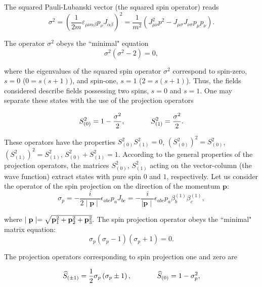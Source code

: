 \documentclass[a4paper,12pt]{article}
\begin{document}
The squared Pauli-Lubanski vector (the squared spin operator)
reads
\begin{equation}
\sigma ^2=\left( \frac 1{2m}\varepsilon _{\mu \nu \alpha \beta
}p_\nu J_{\alpha \beta }\right) ^2=\frac 1{m^2}\left( J_{\mu \nu
}^2p^2-J_{\mu \sigma }J_{\nu \sigma }p_\mu p_\nu \right) .
\label{46}
\end{equation}

The operator $\sigma ^2$ obeys the ``minimal" equation
\begin{equation}
\sigma ^2\left( \sigma ^2-2\right) =0,  \label{47}
\end{equation}

where the eigenvalues of the squared spin operator $\sigma ^2$
correspond to spin-zero, $s=0$ ($0=s(s+1)$),  and spin-one, $s=1$
($2=s(s+1)$). Thus, the fields considered describe fields
possessing two spins, $s=0$ and $s=1$. One may separate these
states with the use of the projection operators

\begin{equation}
S_{(0)}^2=1-\frac{\sigma ^2}2,\hspace{0.5in}S_{(1)}^2=\frac{\sigma
^2}2. \label{48}
\end{equation}

These operators have the properties $S_{(0)}^2S_{(1)}^2=0$,
$\left( S_{(0)}^2\right) ^2=S_{(0)}^2$, $\left( S_{(1)}^2\right)
^2=S_{(1)}^2$, $S_{(0)}^2+S_{(1)}^2=1$. According to the general
properties of the projection operators, the matrices $S_{(0)}^2$,
$S_{(1)}^2$ acting on the vector-column (the wave function)
extract states with pure spin $0$ and $1$, respectively. Let us
consider the operator of the spin projection on the direction of
the momentum $\mathbf{p}$:
\begin{equation}
\sigma _p=-\frac i{2\mid \mathbf{p}\mid }\epsilon
_{abc}p_aJ_{bc}=-\frac i{\mid \mathbf{p}\mid }\epsilon
_{abc}p_a\beta _b^{(1)}\beta _c^{(1)}, \label{49}
\end{equation}

where $\mid {\bf p}\mid =\sqrt{{\bf p}_1^2+{\bf p}_2^2+{\bf p}
_3^2}.$ The spin projection operator obeys the ``minimal" matrix
equation:
\begin{equation}
\sigma _p\left( \sigma _p-1\right) \left( \sigma _p+1\right) =0.
\label{50}
\end{equation}

The projection operators corresponding to spin projection one and
zero are

\begin{equation}
\widehat{S}_{(\pm 1)}=\frac 12\sigma _p\left( \sigma _p\pm
1\right), \hspace{0.5in}\widehat{S}_{(0)}=1-\sigma _p^2,
\label{51}
\end{equation}
\end{document}
